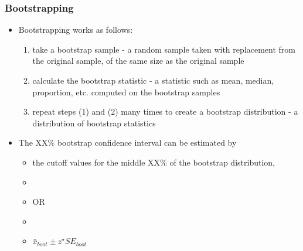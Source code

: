 \documentclass[11pt,containsverbatim,handout,xcolor=xelatex,dvipsnames,table]{beamer}
\begin{document}
\begin{frame}
\frametitle{Bootstrapping}

\begin{itemize}

\item Bootstrapping works as follows:
\pause
\begin{enumerate}[(1)]
\item take a bootstrap sample - a random sample taken with replacement from the original sample, of the same size as the original sample
\pause
\item calculate the bootstrap statistic - a statistic such as mean, median, proportion, etc. computed on the bootstrap samples
\pause
\item repeat steps (1) and (2) many times to create a bootstrap distribution - a distribution of bootstrap statistics
\end{enumerate}

\pause

\item The XX\% bootstrap confidence interval can be estimated by
\begin{itemize}
\pause
\item the cutoff values for the middle XX\% of the bootstrap distribution,
\item[]
\pause
\item[] OR
\item[]
\pause
\item $\bar{x}_{boot} \pm z^\star SE_{boot}$
\end{itemize}

\end{itemize}

\end{frame}

\end{document}
